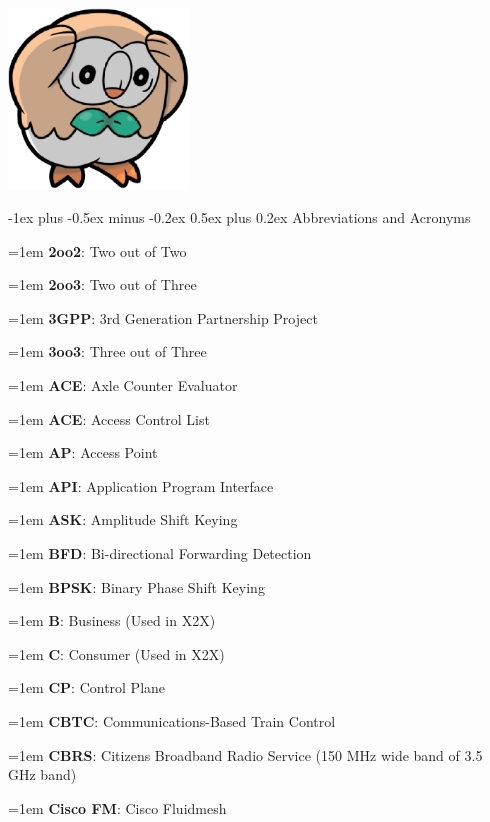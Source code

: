 \documentclass[letterpaper,8pt]{extarticle}
\makeatletter
\newcommand{\definition}[2]{
  \hangindent=1em
  \textbf{#1}: #2%
}
\renewcommand{\section}{\@startsection{section}{1}{0mm}%
  {-1ex plus -0.5ex minus -0.2ex}%
  {0.5ex plus 0.2ex}%
{\color{h1} \normalfont\small\bfseries}}
\makeatother
\begin{document}
\begin{multicols*}{5}

  \begin{center}
    \includegraphics[width=4.8cm]{ROWLET.png}
  \end{center}

  \section{Abbreviations and Acronyms}

  \begin{multicols*}{2}
    \definition{2oo2}{Two out of Two}

    \definition{2oo3}{Two out of Three}

    \definition{3GPP}{3rd Generation Partnership Project}

    \definition{3oo3}{Three out of Three}

    \definition{ACE}{Axle Counter Evaluator}

    \definition{ACE}{Access Control List}

    \definition{AP}{Access Point}

    \definition{API}{Application Program Interface}

    \definition{ASK}{Amplitude Shift Keying}

    \definition{BFD}{Bi-directional Forwarding Detection}

    \definition{BPSK}{Binary Phase Shift Keying}

    \definition{B}{Business (Used in X2X)}

    \definition{C}{Consumer (Used in X2X)}

    \definition{CP}{Control Plane}

    \definition{CBTC}{Communications-Based Train Control}

    \definition{CBRS}{Citizens Broadband Radio Service (150 MHz wide band of 3.5 GHz band)}

    \definition{Cisco FM}{Cisco Fluidmesh}


\end{multicols*}
\end{multicols*}
\end{document}
